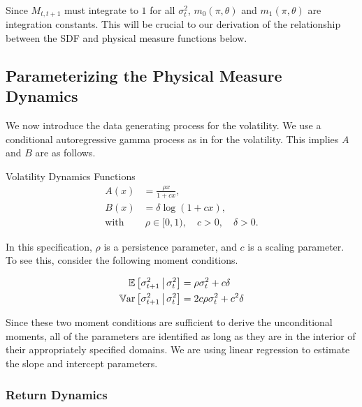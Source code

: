 \documentclass[11pt, letterpaper, twoside]{article}
\begin{document}
Since $M_{t,t+1}$ must integrate to $1$ for all $\sigma^2_t$, $m_{0}(\pi, \theta)$ and $m_1(\pi, \theta)$ are integration constants. This will be crucial to our derivation of the relationship between the SDF and physical measure functions below.

\subsection{Parameterizing the Physical Measure Dynamics}

We now introduce the data generating process for the volatility. We use a conditional autoregressive gamma process as in \textcite{gourieroux2006autoregressive, han2018leverage} for the volatility. This implies $A$ and $B$ are as follows.

\begin{defn}{Volatility Dynamics Functions}
     \label{defn:physical_vol_dynamics}
     \begin{align}
        \label{defn:a_PP}
        A(x) &= \frac{\rho x}{1 + c x}, \\
        \label{defn:b_PP}
        B(x) &= \delta \log(1 + c x),\\
        \text{with}&\ \rho \in [0,1), \quad c > 0, \quad \delta > 0. \nonumber
     \end{align}

\end{defn}

In this specification, $\rho$ is a persistence parameter, and $c$ is a scaling parameter. To see this, consider the following moment conditions. 

\begin{remark} 
 \label{remark:vol_moment_conditions}
    \begin{align}
        \E\left[\sigma^2_{t+1} \mvert \sigma^2_t \right] &= \rho \sigma^2_t + c \delta\\
%   
        \Var\left[\sigma^2_{t+1} \mvert \sigma^2_t \right] &= 2 c \rho \sigma^2_t + c^2 \delta 
%   
    \end{align}
\end{remark}

Since these two moment conditions are sufficient to derive the unconditional moments, all of the parameters are identified as long as they are in the interior of their appropriately specified domains. We are using linear regression to estimate the slope and intercept parameters.

\subsubsection{Return Dynamics}
\end{document}
